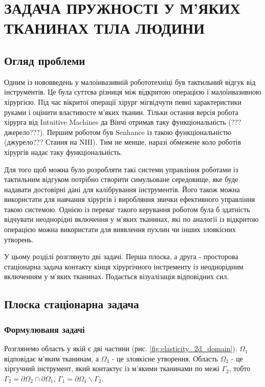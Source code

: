 \chapter{ЗАДАЧА ПРУЖНОСТІ У М'ЯКИХ ТКАНИНАХ ТІЛА ЛЮДИНИ}

\nocite{bahvalov-et-al,benerdge-et-al} 

\section{Огляд проблеми}

Одним із нововведень у малоінвазивній робототехніці був тактильний відгук від інструментів. Це була суттєва різниця між
відкритою операцією і малоінвазивною хірургією. Під час вікритої операції хірург міг відчути певні
характеристики руками і оцінити властивосте м'яких тканин. Тільки остання версія робота хірурга від Intuitive Machines
да Вінчі отримав таку функціональність (???джерело???). Першим роботом був Senhance із такою функціональністю
(джурело??? Стання на NHI). Тим не менше, наразі обмежене коло роботів хірургів надає таку функціональність.

Для того щоб можна було розробляти такі системи управління роботами із тактильним відгуком потрібно створити симульоване 
середовище, яке буде надавати достовірні дані для калібрування інструментів. Його також можна використати для навчання
хірургів і виробляння звички ефективного управління такою системою. Однією із переваг такого керування роботом була б 
здатність відчувати неоднорідні включення у м'яких тканинах, які по аналогії із відкритою операцією можна використати 
для виявлення пухлин чи інших злоякісних утворень.

У цьому розділі розглянуто дві задачі. Перша плоска, а друга - просторова стаціонарна задача контакту кінця хірургічного 
інстременту із неоднорідним включенням у м'яких тканинах. Подається візуалізація відповідних сил.

\section{Плоска стаціонарна задача}

\subsection{Формулюваня задачі}

Розглянемо область у якій є дві частини (рис. \ref{fig:elasticity_2d_domain}). $\Omega_1$ відповідає м'яким тканинам, а
$\Omega_3$ - це злоякісне утворення. Область $\Omega_2$ - це хіргучний інструмент, який контактує із м'якими тканинами
по межі $\Gamma_2$, тобто $\Gamma_2=\partial\Omega_2 \cap \partial\Omega_1$, 
$\Gamma_1 = \partial \Omega_1 \backslash \Gamma_2$.

